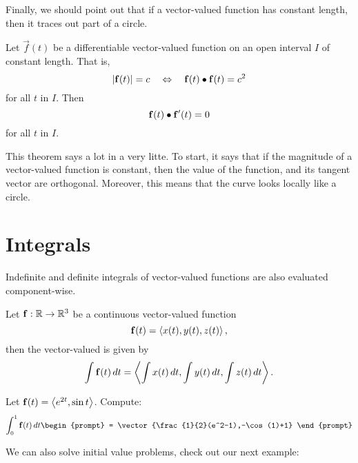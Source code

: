 \documentclass{ximera}
\begin{document}
Finally, we should point out that if a vector-valued function has constant length, then it traces out part of a circle.
\begin{theorem}
  Let $\vec f(t)$ be a differentiable vector-valued function on an open interval $I$ of constant length. That is,
  \[
  |\mathbf f(t)| = c \quad\Leftrightarrow\quad \mathbf f(t)\bullet \mathbf f(t) = c^2
  \]
  for all $t$ in $I$. Then
  \[
  \mathbf f(t)\bullet\mathbf{f}'(t) = 0
  \]
  for all $t$ in $I$.
\end{theorem}
This theorem says a lot in a very litte. To start, it says that if the
magnitude of a vector-valued function is constant, then the value of
the function, and its tangent vector are orthogonal. Moreover, this
means that the curve looks locally like a circle.



\section{Integrals}

Indefinite and definite integrals of vector-valued functions are also evaluated component-wise.

\begin{theorem}
  Let $\mathbf{f}:\mathbb R \to \mathbb R^3$ be a continuous vector-valued function
  \[
  \mathbf{f}(t) = \left\langle x(t),y(t),z(t)\right\rangle,
  \]
  then the vector-valued  is given by
  \[
  \int \mathbf{f}(t) \mathop{}\!d t= \left\langle \int x(t) \mathop{}\!d t,\int y(t)\mathop{}\!d t,\int z(t)\mathop{}\!d t\right\rangle.
  \]
\end{theorem}

\begin{question}
  Let $\mathbf f(t) = \left\langle e^{2t},\sin t\right\rangle$. Compute:
  \[
  \int_0^1 \vec f(t) \d t
  \begin{prompt}
    = \vector{\frac{1}{2}(e^2-1),-\cos(1)+1}
  \end{prompt}
  \]
\end{question}

We can also solve initial value problems, check out our next example:
\end{document}
